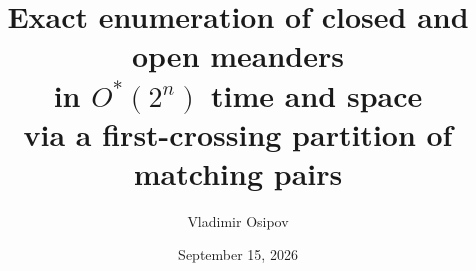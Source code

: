 \documentclass[10pt,a4paper]{article}
\title{{\bfseries\boldmath Exact enumeration of closed and open meanders\\in $O^{*}(2^{n})$ time and space}\\ \large via a first-crossing partition of matching pairs}
\author{Vladimir Osipov}
\date{September 15, 2026}
\begin{document}
\usepackage[showmore,dep_graph,project=../../]{blueprint}

\usepackage{source_links}



\end{document}
